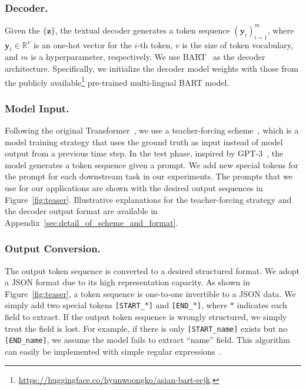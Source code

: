 \documentclass[runningheads]{llncs}
\begin{document}
\subsubsection{Decoder.}
Given the $\{\mathbf{z}\}$, the textual decoder generates a token sequence $(\mathbf{y}_{i})_{i=1}^{m}$, where $ \mathbf{y}_{i}{\in}\mathbb{R}^{v}$ is an one-hot vector for the $i$-th token, $v$ is the size of token vocabulary, and $m$ is a hyperparameter, respectively.
We use BART~\cite{lewis-etal-2020-bart} as the decoder architecture.
Specifically, we initialize the decoder model weights with those from the publicly available\footnote{\url{https://huggingface.co/hyunwoongko/asian-bart-ecjk}.} pre-trained multi-lingual BART model\cite{liu-etal-2020}.


\subsubsection{Model Input.}
Following the original Transformer~\cite{vaswani2017transformer}, we use a teacher-forcing scheme~\cite{williams1989learning}, which is a model training strategy that uses the ground truth as input instead of model output from a previous time step.
In the test phase, inspired by GPT-3~\cite{NEURIPS2020_1457c0d6}, the model generates a token sequence given a prompt.
We add new special tokens for the prompt for each downstream task in our experiments.
The prompts that we use for our applications are shown with the desired output sequences in Figure~\ref{fig:teaser}.
Illustrative explanations for the teacher-forcing strategy and the decoder output format are available in Appendix~\ref{sec:detail_of_scheme_and_format}. 


\subsubsection{Output Conversion.}
The output token sequence is converted to a desired structured format.
We adopt a JSON format due to its high representation capacity.
As shown in Figure~\ref{fig:teaser}, a token sequence is one-to-one invertible to a JSON data.
We simply add two special tokens \texttt{\small [START\_$\ast$]} and \texttt{\small [END\_$\ast$]}, where $\ast$ indicates each field to extract.
If the output token sequence is wrongly structured, we simply treat the field is lost. For example, if there is only \texttt{\small [START\_name]} exists but no \texttt{\small [END\_name]}, we assume the model fails to extract ``name'' field.
This algorithm can easily be implemented with simple regular expressions~\cite{Friedl06}.
\end{document}
